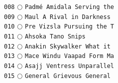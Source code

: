 \documentclass[a4paper,landscape]{article}
\begin{document}
\begin{multicols*}{5}
\texttt{008} \(\bigcirc\)  \texttt{Padmé Amidala Serving the} \vspace{-0.3mm}\\ 
\texttt{009} \(\bigcirc\)  \texttt{Maul A Rival in Darkness} \vspace{-0.3mm}\\ 
\texttt{010} \(\bigcirc\)  \texttt{Pre Vizsla Pursuing the T} \vspace{-0.3mm}\\ 
\texttt{011} \(\bigcirc\)  \texttt{Ahsoka Tano Snips} \vspace{-0.3mm}\\ 
\texttt{012} \(\bigcirc\)  \texttt{Anakin Skywalker What it } \vspace{-0.3mm}\\ 
\texttt{013} \(\bigcirc\)  \texttt{Mace Windu Vaapad Form Ma} \vspace{-0.3mm}\\ 
\texttt{014} \(\bigcirc\)  \texttt{Asajj Ventress Unparallel} \vspace{-0.3mm}\\ 
\texttt{015} \(\bigcirc\)  \texttt{General Grievous General } \vspace{-0.3mm}\\ 

\end{multicols*}
\end{document}
